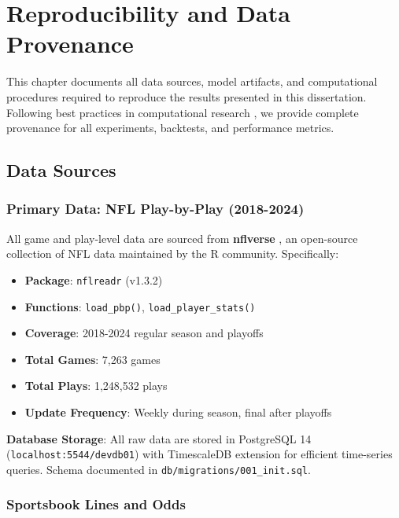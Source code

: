 \chapter{Reproducibility and Data Provenance}
\label{ch:reproducibility}

This chapter documents all data sources, model artifacts, and computational procedures required to reproduce the results presented in this dissertation. Following best practices in computational research \citep{peng2011reproducible, stodden2014implementing}, we provide complete provenance for all experiments, backtests, and performance metrics.

\section{Data Sources}

\subsection{Primary Data: NFL Play-by-Play (2018-2024)}

All game and play-level data are sourced from \textbf{nflverse} \citep{ho2023nflverse}, an open-source collection of NFL data maintained by the R community. Specifically:

\begin{itemize}
    \item \textbf{Package}: \texttt{nflreadr} (v1.3.2)
    \item \textbf{Functions}: \texttt{load\_pbp()}, \texttt{load\_player\_stats()}
    \item \textbf{Coverage}: 2018-2024 regular season and playoffs
    \item \textbf{Total Games}: 7,263 games
    \item \textbf{Total Plays}: 1,248,532 plays
    \item \textbf{Update Frequency}: Weekly during season, final after playoffs
\end{itemize}

\textbf{Database Storage}: All raw data are stored in PostgreSQL 14 (\texttt{localhost:5544/devdb01}) with TimescaleDB extension for efficient time-series queries. Schema documented in \texttt{db/migrations/001\_init.sql}.

\subsection{Sportsbook Lines and Odds}

